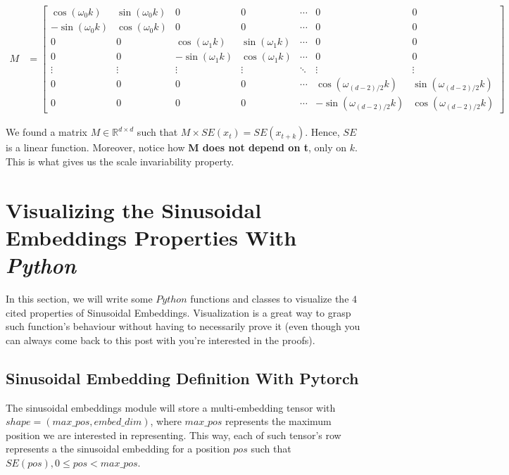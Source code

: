 \documentclass{article}
\begin{document}
\begin{align}
	M &=
	\begin{bmatrix}
		\cos(\omega_0 k) & \sin(\omega_0 k) & 0 & 0 & \cdots & 0 & 0 \\
		-\sin(\omega_0 k) & \cos(\omega_0 k) & 0 & 0 & \cdots & 0 & 0 \\
		0 & 0 & \cos(\omega_1 k) & \sin(\omega_1 k) & \cdots & 0 & 0 \\
		0 & 0 & -\sin(\omega_1 k) & \cos(\omega_1 k) & \cdots & 0 & 0 \\
		\vdots & \vdots & \vdots & \vdots & \ddots & \vdots & \vdots \\
		0 & 0 & 0 & 0 & \cdots & \cos(\omega_{(d-2)/2} k) & \sin(\omega_{(d-2)/2} k) \\
		0 & 0 & 0 & 0 & \cdots & -\sin(\omega_{(d-2)/2} k) & \cos(\omega_{(d-2)/2} k)
	\end{bmatrix}
\end{align}



We found a matrix $M \in \mathbb{R}^{d \times d}$ such that $M \times  SE(x_{t}) = SE(x_{t + k}) $. Hence, $SE$ is a linear function. Moreover, notice how \textbf{M does not depend on t}, only on $k$. This is what gives us the scale invariability property.

\section{Visualizing the Sinusoidal Embeddings Properties With \textit{Python}}

In this section, we will write some $Python$ functions and classes to visualize the $4$ cited properties of Sinusoidal Embeddings. Visualization is a great way to grasp such function's behaviour without having to necessarily prove it (even though you can always come back to this post with you're interested in the proofs).

\subsection{Sinusoidal Embedding Definition With Pytorch}

The sinusoidal embeddings module will store a multi-embedding tensor with $shape =  (max\_pos, embed\_dim)$, where $max\_pos$ represents the maximum position we are interested in representing. This way, each of such tensor's row represents a the sinusoidal embedding for a position $pos$ such that $SE(pos), 0 \leq pos <  max\_pos $. 
\end{document}
